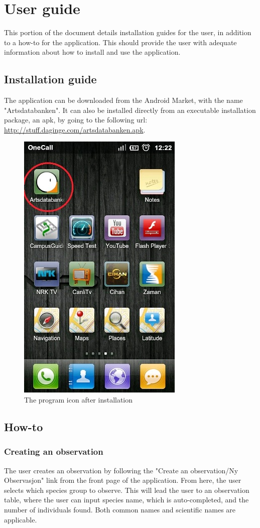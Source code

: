 \newpage
\section{User guide}
This portion of the document details installation guides for the user, in addition to a how-to for the application. This should provide the user with adequate information about how to install and use the application.
\subsection{Installation guide}
The application can be downloaded from the Android Market, with the name "Artsdatabanken". It can also be installed directly from an executable installation package, an apk, by going to the following url: \url{http://stuff.daginge.com/artsdatabanken.apk}.

\begin{figure}[h!]
\centering
 \includegraphics[height=1.0\textwidth]{appendix/pic/run.jpg}
 \caption{The program icon after installation}
 \end{figure}

\subsection{How-to}
\subsubsection{Creating an observation}
The user creates an observation by following the "Create an observation/Ny
Observasjon" link from the front page of the application.  From here, the user
selects which species group to observe.  This will lead the user to an
observation table, where the user can input species name, which is
auto-completed, and the number of individuals found.  Both common names and
scientific names are applicable.


